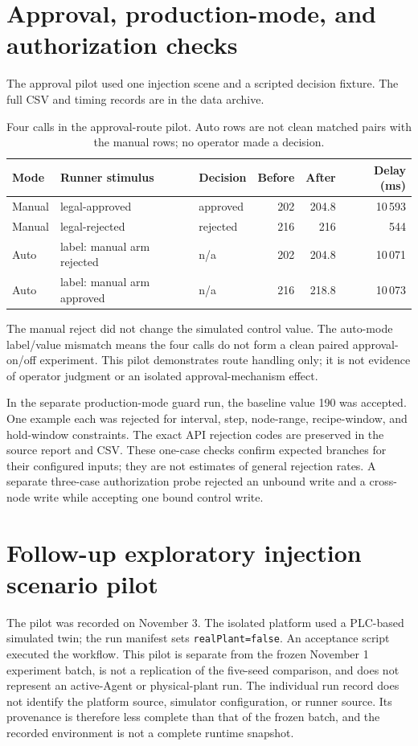 \documentclass[10pt]{article}
\begin{document}
\section*{Approval, production-mode, and authorization checks}
The approval pilot used one injection scene and a scripted decision fixture. The full CSV and timing records are in the data archive.

\begin{table}[h]
\centering
\caption{Four calls in the approval-route pilot. Auto rows are not clean matched pairs with the manual rows; no operator made a decision.}
\begin{tabularx}{\textwidth}{@{}l X l r r r@{}}
\toprule
Mode & Runner stimulus & Decision & Before & After & Delay (ms) \\
\midrule
Manual & legal-approved & approved & 202 & 204.8 & 10\,593 \\
Manual & legal-rejected & rejected & 216 & 216 & 544 \\
Auto & label: manual arm rejected & n/a & 202 & 204.8 & 10\,071 \\
Auto & label: manual arm approved & n/a & 216 & 218.8 & 10\,073 \\
\bottomrule
\end{tabularx}
\end{table}

The manual reject did not change the simulated control value. The auto-mode label/value mismatch means the four calls do not form a clean paired approval-on/off experiment. This pilot demonstrates route handling only; it is not evidence of operator judgment or an isolated approval-mechanism effect.

In the separate production-mode guard run, the baseline value 190 was accepted. One example each was rejected for interval, step, node-range, recipe-window, and hold-window constraints. The exact API rejection codes are preserved in the source report and CSV. These one-case checks confirm expected branches for their configured inputs; they are not estimates of general rejection rates. A separate three-case authorization probe rejected an unbound write and a cross-node write while accepting one bound control write.

\section*{Follow-up exploratory injection scenario pilot}
The pilot was recorded on November 3. The isolated
platform used a PLC-based simulated twin; the run manifest sets
\texttt{realPlant=false}. An acceptance script executed the workflow. This
pilot is separate from the frozen November 1 experiment batch, is not a
replication of the five-seed comparison, and does not represent an active-Agent
or physical-plant run.
The individual run record does not identify the platform source, simulator configuration, or runner source. Its provenance is therefore less complete than that of the frozen batch, and the recorded environment is not a complete runtime snapshot.
\end{document}
